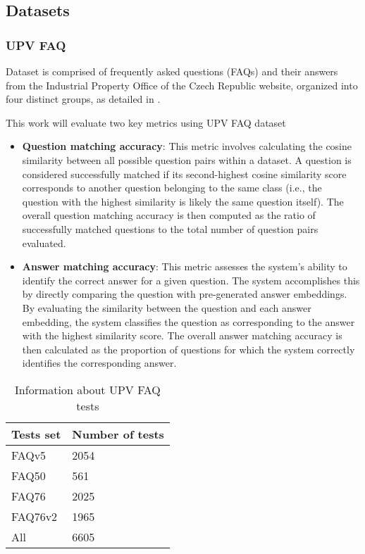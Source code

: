 \subsection{Datasets}

\subsubsection{UPV FAQ}

Dataset is comprised of frequently asked questions (FAQs) and their answers from the Industrial Property Office of the Czech Republic website, organized into four distinct groups, as detailed in .

This work will evaluate two key metrics using UPV FAQ dataset
\begin{itemize}
  \item \textbf{Question matching accuracy}: This metric involves calculating the cosine similarity between all possible question pairs within a dataset.
                                            A question is considered successfully matched if its second-highest cosine similarity score corresponds to another question belonging to the same class (i.e., the question with the highest similarity is likely the same question itself). 
                                            The overall question matching accuracy is then computed as the ratio of successfully matched questions to the total number of question pairs evaluated.  
  \item \textbf{Answer matching accuracy}: This metric assesses the system's ability to identify the correct answer for a given question.
                                            The system accomplishes this by directly comparing the question with pre-generated answer embeddings.
                                            By evaluating the similarity between the question and each answer embedding, the system classifies the question as corresponding to the answer with the highest similarity score.
                                            The overall answer matching accuracy is then calculated as the proportion of questions for which the system correctly identifies the corresponding answer.  
\end{itemize}

\begin{table}[!ht]
  \centering
  \begin{tabular}{ |p{2cm}||p{3cm}| }
    \hline
    Tests set & Number of tests \\
    \hline
    FAQv5     & 2054            \\
    FAQ50     & 561             \\
    FAQ76     & 2025            \\
    FAQ76v2   & 1965            \\
    \hline
    \hline
    All       & 6605            \\
    \hline
  \end{tabular}
  \caption{Information about UPV FAQ tests} \label{table:UPV_FAQ_info}
\end{table}


